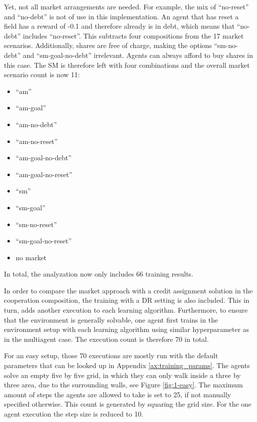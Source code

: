 Yet, not all market arrangements are needed. For example, the mix of ``no-reset'' and ``no-debt'' is not of use in this implementation. An agent that has reset a field has a reward of -0.1 and therefore already is in debt, which means that ``no-debt'' includes ``no-reset''. This subtracts four compositions from the 17 market scenarios. Additionally, shares are free of charge, making the options ``sm-no-debt'' and ``sm-goal-no-debt'' irrelevant. Agents can always afford to buy shares in this case. The SM is therefore left with four combinations and the overall market scenario count is now 11:
\begin{itemize}
    \item ``am''
    \item ``am-goal''
    \item ``am-no-debt''
    \item ``am-no-reset''
    \item ``am-goal-no-debt''
    \item ``am-goal-no-reset''
    \item ``sm''
    \item ``sm-goal''
    \item ``sm-no-reset''
    \item ``sm-goal-no-reset''
    \item no market
\end{itemize}
In total, the analyzation now only includes 66 training results. 

In order to compare the market approach with a credit assignment solution in the cooperation composition, the training with a DR setting is also included. This in turn, adds another execution to each learning algorithm. Furthermore, to ensure that the environment is generally solvable, one agent first trains in the environment setup with each learning algorithm using similar hyperparameter as in the multiagent case. The execution count is therefore 70 in total.

For an easy setup, those 70 executions are mostly run with the default parameters that can be looked up in Appendix \ref{ax:training_params}. The agents solve an empty five by five grid, in which they can only walk inside a three by three area, due to the surrounding walls, see Figure \ref{fig:1-easy}. The maximum amount of steps the agents are allowed to take is set to 25, if not manually specified otherwise. This count is generated by squaring the grid size. For the one agent execution the step size is reduced to 10.

